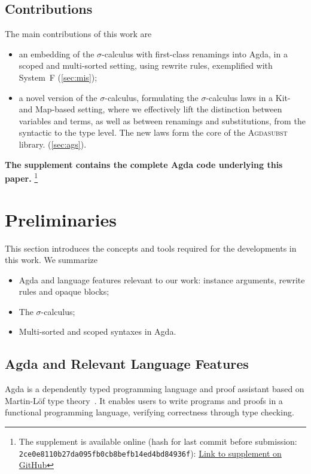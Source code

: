 \documentclass[screen,nonacm]{acmart}
\begin{document}
\subsection*{Contributions}
The main contributions of this work are
\begin{itemize}
      \item an embedding of the $σ$-calculus with first-class renamings into Agda, in a
            scoped and multi-sorted setting, using rewrite rules, exemplified with System~F
            (\cref{sec:mis});
      \item a novel version of the $σ$-calculus, formulating the $σ$-calculus laws in a
            Kit- and Map-based setting, where we effectively lift the distinction between
            variables and terms, as well as between renamings and substitutions, from the
            syntactic to the type level. The new laws form the core of the
            \textsc{Agdasubst} library. (\cref{sec:ags}).
\end{itemize}

\noindent\textbf{The supplement contains the complete Agda code underlying this paper.}
\footnote{The supplement is available online (hash for last commit before submission: \texttt{2ce0e8110b27da095fb0cb8befb14ed4bd84936f}): \href{https://github.com/Mari-W/Agdasubst}{Link to supplement on GitHub}}

\section{Preliminaries}\label{sec:pre}
This section introduces the concepts and tools required for the developments in
this work. We summarize
\begin{itemize}
      \item Agda and language features relevant to our work: instance arguments, rewrite
            rules and opaque blocks;
      \item The $σ$-calculus;
      \item Multi-sorted and scoped syntaxes in Agda.
\end{itemize}

\subsection{Agda and Relevant Language Features}\label{sec:pre-agd}
Agda is a dependently typed programming language and proof assistant based on
Martin-Löf type theory~\cite{MARTINLOF197573}. It enables users to write
programs and proofs in a functional programming language, verifying correctness
through type checking.
\end{document}
